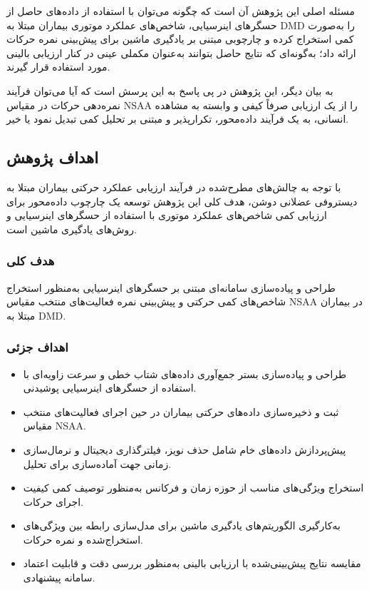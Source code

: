 مسئله اصلی این پژوهش آن است که چگونه می‌توان با استفاده از داده‌های حاصل از حسگرهای اینرسیایی، شاخص‌های عملکرد موتوری بیماران مبتلا به DMD را به‌صورت کمی استخراج کرده و چارچوبی مبتنی بر یادگیری ماشین برای پیش‌بینی نمره حرکات ارائه داد؛ به‌گونه‌ای که نتایج حاصل بتوانند به‌عنوان مکملی عینی در کنار ارزیابی بالینی مورد استفاده قرار گیرند.

به بیان دیگر، این پژوهش در پی پاسخ به این پرسش است که آیا می‌توان فرآیند نمره‌دهی حرکات در مقیاس NSAA را از یک ارزیابی صرفاً کیفی و وابسته به مشاهده انسانی، به یک فرآیند داده‌محور، تکرارپذیر و مبتنی بر تحلیل کمی تبدیل نمود یا خیر.

\subsection{اهداف پژوهش}

با توجه به چالش‌های مطرح‌شده در فرآیند ارزیابی عملکرد حرکتی بیماران مبتلا به دیستروفی عضلانی دوشن، هدف کلی این پژوهش توسعه یک چارچوب داده‌محور برای ارزیابی کمی شاخص‌های عملکرد موتوری با استفاده از حسگرهای اینرسیایی و روش‌های یادگیری ماشین است.

\subsubsection*{هدف کلی}

طراحی و پیاده‌سازی سامانه‌ای مبتنی بر حسگرهای اینرسیایی به‌منظور استخراج شاخص‌های کمی حرکتی و پیش‌بینی نمره فعالیت‌های منتخب مقیاس NSAA در بیماران مبتلا به DMD.

\subsubsection*{اهداف جزئی}

\begin{itemize}
	\item طراحی و پیاده‌سازی بستر جمع‌آوری داده‌های شتاب خطی و سرعت زاویه‌ای با استفاده از حسگرهای اینرسیایی پوشیدنی.
	
	\item ثبت و ذخیره‌سازی داده‌های حرکتی بیماران در حین اجرای فعالیت‌های منتخب مقیاس NSAA.
	
	\item پیش‌پردازش داده‌های خام شامل حذف نویز، فیلترگذاری دیجیتال و نرمال‌سازی زمانی جهت آماده‌سازی برای تحلیل.
	
	\item استخراج ویژگی‌های مناسب از حوزه زمان و فرکانس به‌منظور توصیف کمی کیفیت اجرای حرکات.
	
	\item به‌کارگیری الگوریتم‌های یادگیری ماشین برای مدل‌سازی رابطه بین ویژگی‌های استخراج‌شده و نمره حرکات.
	
	\item مقایسه نتایج پیش‌بینی‌شده با ارزیابی بالینی به‌منظور بررسی دقت و قابلیت اعتماد سامانه پیشنهادی.
\end{itemize}

